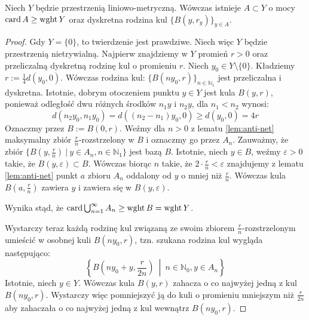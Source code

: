 \begin{lem} \label{lem:balls-many}
  Niech $Y$ będzie przestrzenią liniowo-metryczną. Wówczas istnieje $A \subset Y$ o mocy $\operatorname{card} A \geq \operatorname{wght} Y$ oraz dyskretna rodzina kul $\{B(y, r_y)\}_{y \in A}$.
  
  \begin{proof}
    Gdy $Y = \{0\}$, to twierdzenie jest prawdziwe. Niech więc $Y$ będzie przestrzenią nietrywialną.
    Najpierw znajdziemy w $Y$ promień $r > 0$ oraz przeliczalną dyskretną rodzinę kul o promieniu $r$. Niech $y_0 \in Y\setminus\{0\}$. Kładziemy $r := \frac{1}{4} d(y_0,0)$. Wówczas rodzina kul: $\{B(ny_0, r)\}_{n \in \mathbb{N}_1}$ jest przeliczalna i dyskretna. Istotnie, dobrym otoczeniem punktu $y \in Y$ jest kula $B(y,r)$, ponieważ odległość dwu różnych środków $n_1 y$ i $n_2 y$, dla $n_1 < n_2$ wynosi:
    \[
      d(n_2 y_0, n_1 y_0) = d((n_2 - n_1)y_0, 0) \geq d(y_0, 0) = 4r
    \]
    Oznaczmy przez $B := B(0,r)$. Weźmy dla $n > 0$ z lematu \ref{lem:anti-net} maksymalny zbiór $\frac{r}{n}$-rozstrzelony w $B$ i oznaczmy go przez $A_n$. Zauważmy, że zbiór $\{B(y, \frac{r}{n})\ |\ y \in A_n, n \in \mathbb{N}_1\}$ jest bazą $B$. Istotnie, niech $y \in B$, weźmy $\varepsilon > 0$ takie, że $B(y,\varepsilon) \subset B$. Wówczas biorąc $n$ takie, że $2 \cdot \frac{r}{n} < \varepsilon$ znajdujemy z lematu \ref{lem:anti-net} punkt $a$ zbioru $A_n$ oddalony od $y$ o mniej niż $\frac{r}{n}$. Wówczas kula $B(a, \frac{r}{n})$ zawiera $y$ i zawiera się w $B(y,\varepsilon)$.
    
    Wynika stąd, że $\operatorname{card} \bigcup_{n=1}^\infty A_n \geq \operatorname{wght} B = \operatorname{wght} Y$.
    
    Wystarczy teraz każdą rodzinę kul związaną ze swoim zbiorem $\frac{r}{n}$-rozstrzelonym umieścić w osobnej kuli $B(ny_0, r)$, tzn. szukana rodzina kul wygląda następująco:
    \[
      \left\{B\left(ny_0 + y, \frac{r}{2n}\right)\ \middle|\ n \in \mathbb{N}_0, y \in A_n\right\}
    \]
    Istotnie, niech $y \in Y$. Wówczas kula $B(y,r)$ zahacza o co najwyżej jedną z kul $B(ny_0, r)$. Wystarczy więc pomniejszyć ją do kuli o promieniu mniejszym niż $\frac{r}{2n}$ aby zahaczała o co najwyżej jedną z kul wewnątrz $B(ny_0, r)$.
  \end{proof}
\end{lem}

